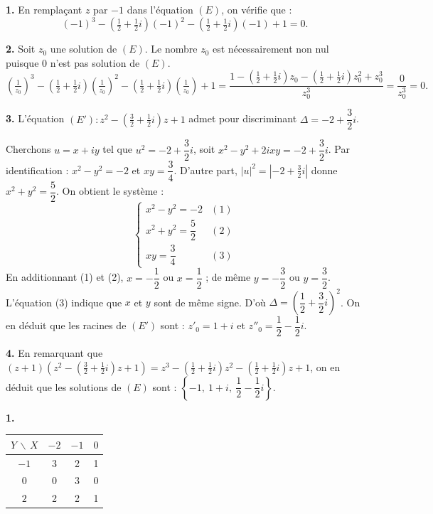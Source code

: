 \documentclass[11pt]{article}
\begin{document}


\textbf{1.} En remplaçant $z$ par $-1$ dans l'équation $(E)$, on vérifie que :
\[ (-1)^3 - \left(\tfrac{1}{2} + \tfrac{1}{2}i\right)(-1)^2 - \left(\tfrac{1}{2} + \tfrac{1}{2}i\right)(-1) + 1 = 0. \]

\textbf{2.} Soit $z_0$ une solution de $(E)$. Le nombre $z_0$ est nécessairement non nul puisque 0 n'est pas solution de $(E)$.
\[ \left(\tfrac{1}{z_0}\right)^3 - \left(\tfrac{1}{2} + \tfrac{1}{2}i\right)\left(\tfrac{1}{z_0}\right)^2 - \left(\tfrac{1}{2} + \tfrac{1}{2}i\right)\left(\tfrac{1}{z_0}\right) + 1 = \frac{1 - \left(\tfrac{1}{2} + \tfrac{1}{2}i\right)z_0 - \left(\tfrac{1}{2} + \tfrac{1}{2}i\right)z_0^2 + z_0^3}{z_0^3} = \frac{0}{z_0^3} = 0. \]

\textbf{3.} L'équation $(E') : z^2 - \left(\tfrac{3}{2} + \tfrac{1}{2}i\right)z + 1$ admet pour discriminant $\Delta = -2 + \dfrac{3}{2}i$.

Cherchons $u = x + iy$ tel que $u^2 = -2 + \dfrac{3}{2}i$, soit $x^2 - y^2 + 2ixy = -2 + \dfrac{3}{2}i$. Par identification : $x^2 - y^2 = -2$ et $xy = \dfrac{3}{4}$. D'autre part, $|u|^2 = \left|-2 + \tfrac{3}{2}i\right|$ donne $x^2 + y^2 = \dfrac{5}{2}$. On obtient le système :
\[ \begin{cases} x^2 - y^2 = -2 & (1) \\ x^2 + y^2 = \dfrac{5}{2} & (2) \\ xy = \dfrac{3}{4} & (3) \end{cases} \]
En additionnant (1) et (2), $x = -\dfrac{1}{2}$ ou $x = \dfrac{1}{2}$ ; de même $y = -\dfrac{3}{2}$ ou $y = \dfrac{3}{2}$. L'équation (3) indique que $x$ et $y$ sont de même signe. D'où $\Delta = \left(\dfrac{1}{2} + \dfrac{3}{2}i\right)^2$. On en déduit que les racines de $(E')$ sont : $z'_0 = 1 + i$ et $z''_0 = \dfrac{1}{2} - \dfrac{1}{2}i$.

\textbf{4.} En remarquant que $(z + 1)\left(z^2 - \left(\tfrac{3}{2} + \tfrac{1}{2}i\right)z + 1\right) = z^3 - \left(\tfrac{1}{2} + \tfrac{1}{2}i\right)z^2 - \left(\tfrac{1}{2} + \tfrac{1}{2}i\right)z + 1$, on en déduit que les solutions de $(E)$ sont : $\left\{-1,\ 1 + i,\ \dfrac{1}{2} - \dfrac{1}{2}i\right\}$.


\textbf{1.}
\begin{center}
\renewcommand{\arraystretch}{1.3}
\begin{tabular}{|c|c|c|c|}
\hline
$Y\,\backslash\,X$ & $-2$ & $-1$ & $0$ \\
\hline
$-1$ & 3 & 2 & 1 \\
\hline
$0$ & 0 & 3 & 0 \\
\hline
$2$ & 2 & 2 & 1 \\
\hline
\end{tabular}
\end{center}
\end{document}
